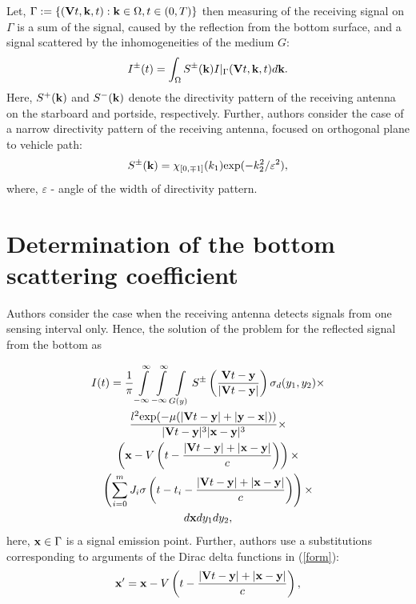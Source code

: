 \documentclass{procDDs}
\begin{document}
Let, $\Gamma := \{ (\mathbf{V}t, \mathbf{k}, t): \mathbf{k} \in \Omega, t \in (0,T) \}$  then measuring of the receiving signal on $\Gamma$ is a sum of the signal, caused by the reflection from the bottom surface, and a signal scattered by the inhomogeneities of the medium $G$:
\begin{multline}
	\label{sum_sig}
	I^\pm(t) = \int_{\Omega} S^\pm(\mathbf{k}) I|_{\Gamma}(\mathbf{V}t, \mathbf{k}, t)d\mathbf{k}.
\end{multline}
Here, $S^+(\mathbf{k})$ and $S^-(\mathbf{k})$ denote the directivity pattern of the receiving antenna on the starboard and portside, respectively. Further, authors consider the case of a narrow directivity pattern of the receiving antenna, focused on orthogonal plane to vehicle path:
\begin{equation}
\label{diagram}
S^\pm(\mathbf{k}) = \chi_{[0,\mp1]}(k_1)  \text{exp}(-k_2^2/\varepsilon^2),
\end{equation}
where, $\varepsilon $ - angle of the width of directivity pattern.

\section{Determination of the bottom scattering coefficient}

Authors consider the case when the receiving antenna detects signals from one sensing interval only. Hence, the solution of the problem for the reflected signal from the bottom as

\begin{multline}
	\label{form}
	I(t) = \frac{1}{\pi} \int\limits_{-\infty}^{\infty} \int\limits_{-\infty}^{\infty} \int\limits_{G(y)} S^\pm \left( \frac{\mathbf{V}t - \mathbf{y}}{|\mathbf{V}t - \mathbf{y}|} \right) \sigma_d(y_1,y_2)  \times \\
	\frac{l^2 \text{exp}(-\mu(|\mathbf{V}t-\mathbf{y}|+|\mathbf{y} - \mathbf{x}|))}{|\mathbf{V}t - \mathbf{y}|^3|\mathbf{x}-\mathbf{y}|^3}  \times \\
	\left( \mathbf{x} - V\left( t-\frac{|\mathbf{V}t-\mathbf{y}|+|\mathbf{x}-\mathbf{y}|}{c} \right) \right) \times \\
	\left( \sum_{i=0}^{m} J_i\sigma \left( t-t_i - \frac{|\mathbf{V}t-\mathbf{y}|+|\mathbf{x}-\mathbf{y}|}{c} \right)\right) \times \\
	 d\mathbf{x} dy_1 dy_2,  	 
\end{multline}
here, $\mathbf{x} \in \Gamma$ is a signal emission point. Further, authors use a substitutions corresponding to arguments of the Dirac delta functions in (\ref{form}):
\begin{equation}
	\label{form_x}
	\mathbf{x}' = \mathbf{x} - V\left( t-\frac{|\mathbf{V}t-\mathbf{y}|+|\mathbf{x}-\mathbf{y}|}{c} \right),
\end{equation}
\end{document}
